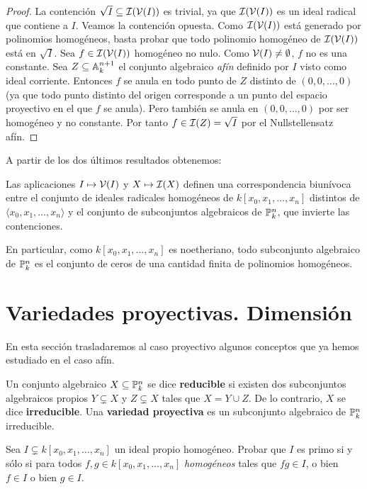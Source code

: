 \documentclass[ACGA.tex]{subfiles}
\begin{document}
\begin{proof}
 La contención $\sqrt{I}\subseteq\mathcal{I}(\mathcal{V}(I))$ es trivial, ya que $\mathcal{I}(\mathcal{V}(I))$ es un ideal radical que contiene a $I$. Veamos la contención opuesta. Como $\mathcal{I}(\mathcal{V}(I))$ está generado por polinomios homogéneos, basta probar que todo polinomio homogéneo de $\mathcal{I}(\mathcal{V}(I))$ está en $\sqrt{I}$. Sea $f\in \mathcal{I}(\mathcal{V}(I))$ homogéneo no nulo. Como $\mathcal{V}(I)\neq \emptyset$, $f$ no es una constante. Sea $Z\subseteq\mathbb{A}^{n+1}_k$ el conjunto algebraico \emph{afín} definido por $I$ visto como ideal corriente. Entonces $f$ se anula en todo punto de $Z$ distinto de $(0,0,\ldots,0)$ (ya que todo punto distinto del origen corresponde a un punto del espacio proyectivo en el que $f$ se anula). Pero también se anula en $(0,0,\ldots,0)$ por ser homogéneo y no constante. Por tanto $f\in\mathcal{I}(Z)=\sqrt{I}$ por el Nullstellensatz afín.
\end{proof}

A partir de los dos últimos resultados obtenemos:

\begin{coro}
 Las aplicaciones $I\mapsto\mathcal{V}(I)$ y $X\mapsto\mathcal{I}(X)$ definen una correspondencia biunívoca entre el conjunto de ideales radicales homogéneos de $k[x_0,x_1,\ldots,x_n]$ distintos de $\langle x_0,x_1,\ldots,x_n\rangle$ y el conjunto de subconjuntos algebraicos de $\mathbb{P}^n_k$, que invierte las contenciones.
\end{coro}

En particular, como $k[x_0,x_1,\ldots,x_n]$ es noetheriano, todo subconjunto algebraico de $\mathbb{P}^n_k$ es el conjunto de ceros de una cantidad finita de polinomios homogéneos. 

\section{Variedades proyectivas. Dimensión}

En esta sección trasladaremos al caso proyectivo algunos conceptos que ya hemos estudiado en el caso afín. 

\begin{defi}
 Un conjunto algebraico $X\subseteq\mathbb{P}^n_k$ se dice {\bf reducible} si existen dos subconjuntos algebraicos propios $Y\subsetneq X$ y $Z\subsetneq X$ tales que $X=Y\cup Z$. De lo contrario, $X$ se dice {\bf irreducible}. Una {\bf variedad proyectiva} es un subconjunto algebraico de $\mathbb{P}^n_k$ irreducible.
\end{defi}

\begin{ejer}\label{primohomogeneo}
 Sea $I\subsetneq k[x_0,x_1,\ldots,x_n]$ un ideal propio homogéneo. Probar que $I$ es primo si y sólo si para todos $f,g\in k[x_0,x_1,\ldots,x_n]$ \emph{homogéneos} tales que $fg\in I$, o bien $f\in I$ o bien $g\in I$.
\end{ejer}
\end{document}
